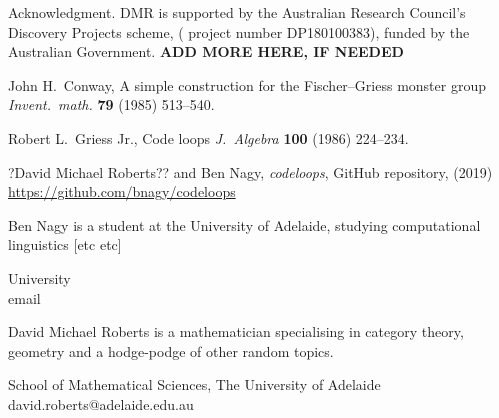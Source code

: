 \documentclass{article}
\theoremstyle{plain}
\theoremstyle{definition}
\newtheorem*{definition}{Definition}
\newtheorem*{remark}{Remark}
\begin{document}



\begin{acknowledgment}{Acknowledgment.}
DMR is supported by the Australian Research Council's Discovery Projects scheme, ( project number DP180100383), funded by the Australian Government. \textbf{ADD MORE HERE, IF NEEDED}
\end{acknowledgment}

\begin{thebibliography}{1}

 John H.\ Conway, A simple construction for the Fischer--Griess monster group \emph{Invent.\ math.} \textbf{79} (1985) 513--540.

 Robert L.\ Griess Jr., Code loops \emph{J.\ Algebra} \textbf{100} (1986) 224--234.

 ?David Michael Roberts?? and Ben Nagy, \emph{codeloops}, GitHub repository, (2019) \url{https://github.com/bnagy/codeloops}
\end{thebibliography}

\begin{biog}
\item[Ben Nagy] is a student at the University of Adelaide, studying computational linguistics [etc etc]
\begin{affil}
University\\
email
\end{affil}

\item[David Michael Roberts] is a mathematician specialising in category theory, geometry and a hodge-podge of other random topics.
\begin{affil}
School of Mathematical Sciences, The University of Adelaide\\
david.roberts@adelaide.edu.au
\end{affil}
\end{biog}
\vfill\eject
\end{document}
